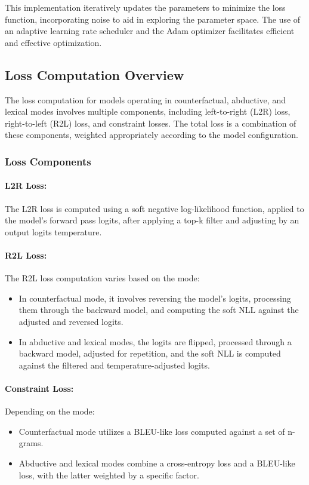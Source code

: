 \documentclass{article}
\begin{document}
This implementation iteratively updates the parameters to minimize the loss function, incorporating noise to aid in exploring the parameter space. The use of an adaptive learning rate scheduler and the Adam optimizer facilitates efficient and effective optimization.

\subsection{Loss Computation Overview}

The loss computation for models operating in counterfactual, abductive, and lexical modes involves multiple components, including left-to-right (L2R) loss, right-to-left (R2L) loss, and constraint losses. The total loss is a combination of these components, weighted appropriately according to the model configuration.

\subsubsection{Loss Components}

\paragraph{L2R Loss:} The L2R loss is computed using a soft negative log-likelihood function, applied to the model's forward pass logits, after applying a top-k filter and adjusting by an output logits temperature.

\paragraph{R2L Loss:} The R2L loss computation varies based on the mode:
\begin{itemize}
    \item In counterfactual mode, it involves reversing the model's logits, processing them through the backward model, and computing the soft NLL against the adjusted and reversed logits.
    \item In abductive and lexical modes, the logits are flipped, processed through a backward model, adjusted for repetition, and the soft NLL is computed against the filtered and temperature-adjusted logits.
\end{itemize}

\paragraph{Constraint Loss:} Depending on the mode:
\begin{itemize}
    \item Counterfactual mode utilizes a BLEU-like loss computed against a set of n-grams.
    \item Abductive and lexical modes combine a cross-entropy loss and a BLEU-like loss, with the latter weighted by a specific factor.
\end{itemize}
\end{document}

